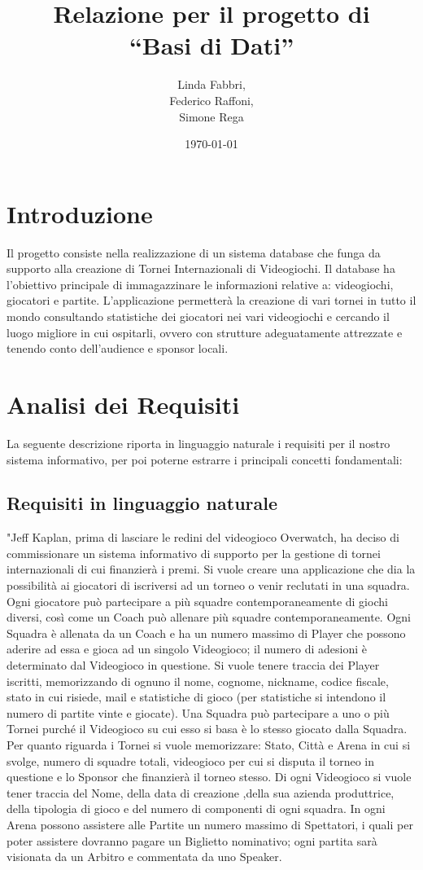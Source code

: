 \documentclass[a4paper,12pt]{report}
\title{Relazione per il progetto di\\``Basi di Dati''}
\author{Linda Fabbri,\\Federico Raffoni,\\Simone Rega}
\date{\today}
\begin{document}
\maketitle

\tableofcontents

\chapter{Introduzione}

Il progetto consiste nella realizzazione di un sistema database che funga da supporto alla creazione di Tornei Internazionali di Videogiochi.
Il database ha l'obiettivo principale di immagazzinare le informazioni relative a: videogiochi, giocatori e partite. 
L'applicazione permetterà la creazione di vari tornei in tutto il mondo consultando statistiche dei giocatori nei vari videogiochi e cercando il luogo migliore in cui ospitarli, ovvero con strutture adeguatamente attrezzate e tenendo conto dell'audience e sponsor locali.


\chapter{Analisi dei Requisiti}
La seguente descrizione riporta in linguaggio naturale i requisiti per il nostro sistema informativo, per poi poterne estrarre i principali concetti fondamentali:
\section{Requisiti in linguaggio naturale}
"Jeff Kaplan, prima di lasciare le redini del videogioco Overwatch, ha deciso di commissionare un sistema informativo di supporto per la gestione di tornei internazionali di cui finanzierà i premi.
Si vuole creare una applicazione che dia la possibilità ai giocatori di iscriversi ad un torneo o venir reclutati in una squadra.
Ogni giocatore può partecipare a più squadre contemporaneamente di giochi diversi, così come un Coach può allenare più squadre contemporaneamente.
Ogni Squadra è allenata da un Coach e ha un numero massimo di Player che possono aderire ad essa e gioca ad un singolo Videogioco; il numero di adesioni è determinato dal Videogioco in questione.
Si vuole tenere traccia dei Player iscritti, memorizzando di ognuno il nome, cognome, nickname, codice fiscale, stato in cui risiede, mail e statistiche di gioco (per statistiche si intendono il numero di partite vinte e giocate).
Una Squadra può partecipare a uno o più Tornei purché il Videogioco su cui esso si basa è lo stesso giocato dalla Squadra.
Per quanto riguarda i Tornei si vuole memorizzare: Stato, Città e Arena in cui si svolge, numero di squadre totali, videogioco per cui si disputa il torneo in questione e lo Sponsor che finanzierà il torneo stesso.
Di ogni Videogioco si vuole tener traccia del Nome, della data di creazione ,della sua azienda produttrice, della tipologia di gioco e del numero di componenti di ogni squadra.
In ogni Arena possono assistere alle Partite un numero massimo di Spettatori, i quali per poter assistere dovranno pagare un Biglietto nominativo; ogni partita sarà visionata da un Arbitro e commentata da uno Speaker.
\end{document}

